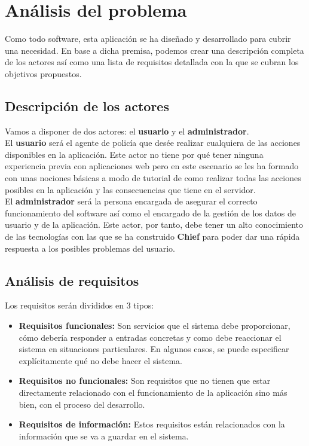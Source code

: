 \chapter{Análisis del problema}
 
 Como todo software, esta aplicación se ha diseñado y desarrollado para cubrir una
 necesidad. En base a dicha premisa, podemos crear una descripción completa de los 
 actores así como una lista de requisitos detallada con la que se cubran los objetivos 
 propuestos.

\section{Descripción de los actores}
Vamos a disponer de dos actores: el \textbf{usuario} y el \textbf{administrador}.\\

El \textbf{usuario} será el agente de policía que desée realizar cualquiera de las acciones
disponibles en la aplicación. Este actor no tiene por qué tener ninguna experiencia previa
con aplicaciones web pero en este escenario se les ha formado con unas nociones básicas 
a modo de tutorial de como realizar todas las acciones posibles en la aplicación y las consecuencias
que tiene en el servidor.\\

El \textbf{administrador} será la persona encargada de asegurar el correcto funcionamiento 
del software así como el encargado de la gestión de los datos de usuario y de la aplicación. Este
actor, por tanto, debe tener un alto conocimiento de las tecnologías con las que se ha construido
\textbf{Chief} para poder dar una rápida respuesta a los posibles problemas del usuario.

\section{Análisis de requisitos}

Los requisitos serán divididos en 3 tipos:

\begin{itemize}
   \item \textbf{Requisitos funcionales:} Son servicios que el sistema debe proporcionar, cómo
   debería responder a entradas concretas y como debe reaccionar el sistema en situaciones 
   particulares. En algunos casos, se puede especificar explícitamente qué no debe hacer el sistema.

   \item \textbf{Requisitos no funcionales:} Son requisitos que no tienen que estar directamente relacionado
   con el funcionamiento de la aplicación sino más bien, con el proceso del desarrollo.
   
   \item \textbf{Requisitos de información:} Estos requisitos están relacionados con la información 
   que se va a guardar en el sistema.

\end{itemize}

